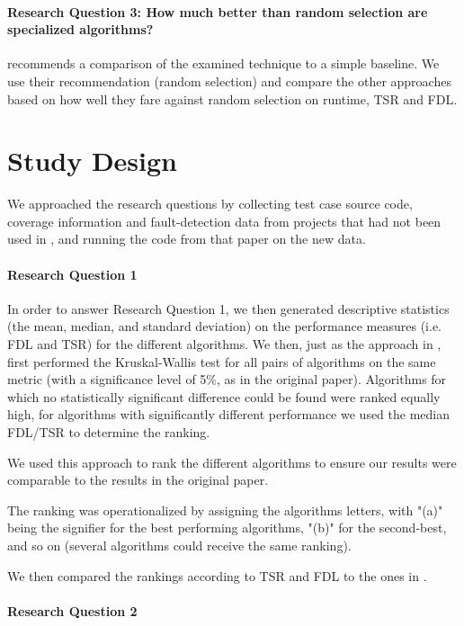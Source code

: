 \paragraph{Research Question 3: How much better than random selection are specialized algorithms?}

\cite{khan2018systematic} recommends a comparison of the examined
technique to a simple baseline. We use their recommendation (random
selection) and compare the other approaches based on how well they fare
against random selection on runtime, TSR and FDL.

\section{Study Design}

We approached the research questions by collecting test case source code,
coverage information and fault-detection data from projects that had
not been used in \cite{cruciani2019scalable}, and running the code from
that paper on the new data.

\paragraph{Research Question 1}

In order to answer Research Question 1, we then generated descriptive
statistics (the mean, median, and standard deviation) on the performance
measures (i.e. FDL and TSR) for the different algorithms. We then,
just as the approach in \cite{cruciani2019scalable}, first performed the
Kruskal-Wallis test for all pairs of algorithms on the same metric (with
a significance level of 5\%, as in the original paper). Algorithms for
which no statistically significant difference could be found were ranked
equally high, for algorithms with significantly different performance
we used the median FDL/TSR to determine the ranking.

We used this approach to rank the different algorithms to ensure our
results were comparable to the results in the original paper.

The ranking was operationalized by assigning the algorithms letters,
with "(a)" being the signifier for the best performing algorithms,
"(b)" for the second-best, and so on (several algorithms could receive
the same ranking).

We then compared the rankings according to TSR and FDL to the ones in
\cite{cruciani2019scalable}.

\paragraph{Research Question 2}

